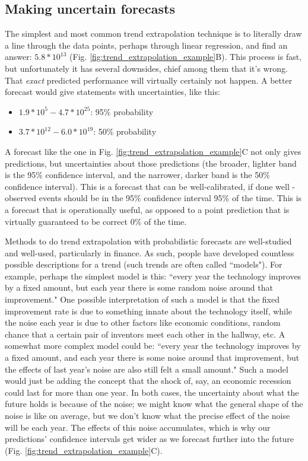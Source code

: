 \documentclass{article}
\begin{document}
\subsection{Making uncertain forecasts}\label{forecasting_basics}
The simplest and most common trend extrapolation technique is to literally draw a line through the data points, perhaps through linear regression, and find an answer: $5.8*10^{13}$ (Fig. \ref{fig:trend_extrapolation_example}B). This process is fast, but unfortunately it has several downsides, chief among them that it's wrong. That \textit{exact} predicted performance will virtually certainly not happen. A better forecast would give statements with uncertainties, like this: 
\begin{itemize}
    \item $1.9*10^5 - 4.7*10^{25}$: 95\% probability
    \item $3.7*10^{12} - 6.0*10^{19}$: 50\% probability
\end{itemize}

A forecast like the one in Fig. \ref{fig:trend_extrapolation_example}C not only gives predictions, but uncertainties about those predictions (the broader, lighter band is the 95\% confidence interval, and the narrower, darker band is the 50\% confidence interval). This is a forecast that can be well-calibrated, if done well - observed events should be in the 95\% confidence interval 95\% of the time. This is a forecast that is operationally useful, as opposed to a point prediction that is virtually guaranteed to be correct 0\% of the time. 

Methods to do trend extrapolation with probabilistic forecasts are well-studied and well-used, particularly in finance. As such, people have developed countless possible descriptions for a trend (such trends are often called ``models"). For example, perhaps the simplest model is this: ``every year the technology improves by a fixed amount, but each year there is some random noise around that improvement." One possible interpretation of such a model is that the fixed improvement rate is due to something innate about the technology itself, while the noise each year is due to other factors like economic conditions, random chance that a certain pair of inventors meet each other in the hallway, etc. A somewhat more complex model could be: ``every year the technology improves by a fixed amount, and each year there is some noise around that improvement, but the effects of last year's noise are also still felt a small amount." Such a model would just be adding the concept that the shock of, say, an economic recession could last for more than one year. In both cases, the uncertainty about what the future holds is because of the noise; we might know what the general shape of the noise is like on average, but we don't know what the precise effect of the noise will be each year. The effects of this noise accumulates, which is why our predictions' confidence intervals get wider as we forecast further into the future (Fig. \ref{fig:trend_extrapolation_example}C).
\end{document}
